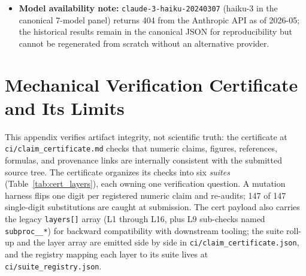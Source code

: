 \documentclass{article}
\theoremstyle{plain}
\theoremstyle{definition}
\theoremstyle{remark}
\begin{document}
\begin{itemize}
\item[$\checkmark$] \textbf{Model availability note:} \texttt{claude-3-haiku-20240307} (haiku-3 in the canonical 7-model panel) returns 404 from the Anthropic API as of 2026-05; the historical results remain in the canonical JSON for reproducibility but cannot be regenerated from scratch without an alternative provider.
\end{itemize}

\section{Mechanical Verification Certificate and Its Limits}\label{app:cert_scope}

This appendix verifies artifact integrity, not scientific truth: the certificate at \texttt{ci/claim\_certificate.md} checks that numeric claims, figures, references, formulas, and provenance links are internally consistent with the submitted source tree. The certificate organizes its checks into six \emph{suites} (Table~\ref{tab:cert_layers}), each owning one verification question. A mutation harness flips one digit per registered numeric claim and re-audits; 147 of 147 single-digit substitutions are caught at submission. The cert payload also carries the legacy \texttt{layers[]} array (L1 through L16, plus L9 sub-checks named \texttt{subproc\_\_*}) for backward compatibility with downstream tooling; the suite roll-up and the layer array are emitted side by side in \texttt{ci/claim\_certificate.json}, and the registry mapping each layer to its suite lives at \texttt{ci/suite\_registry.json}.
\end{document}
